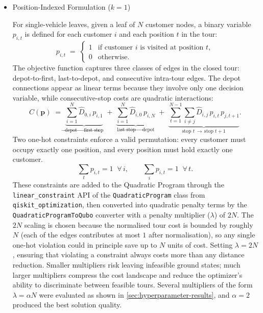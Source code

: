 \documentclass[a4paper]{report}
\begin{document}
{\begin{itemize}
\begin{itemize}

\item{Position-Indexed Formulation ($k=1$)}
 
For single-vehicle leaves, given a leaf of
$N$ customer nodes, a binary variable $p_{i,t}$ is defined for each
customer $i$ and each position $t$ in the tour:
\begin{equation}
p_{i,t} \;=\;
\begin{cases}
1 & \text{if customer } i \text{ is visited at position } t,\\
0 & \text{otherwise}.
\end{cases}
\end{equation}
The objective function captures
three classes of edges in the closed tour: depot-to-first,
last-to-depot, and consecutive intra-tour edges. The depot connections
appear as linear terms because they involve only one decision variable,
while consecutive-stop costs are quadratic interactions:
\begin{equation}
C(\mathbf{p}) \;=\;
\underbrace{\sum_{i=1}^{N} \hat{D}_{0,i}\, p_{i,1}}_{\text{depot}\,\to\,\text{first stop}}
\;+\;
\underbrace{\sum_{i=1}^{N} \hat{D}_{i,0}\, p_{i,N}}_{\text{last stop}\,\to\,\text{depot}}
\;+\;
\underbrace{\sum_{t=1}^{N-1}\sum_{i \neq j} \hat{D}_{i,j}\, p_{i,t}\, p_{j,t+1}}_{\text{stop } t\,\to\,\text{stop } t+1}.
\label{eq:posidx-cost}
\end{equation}
Two one-hot constraints enforce a valid permutation: every
customer must occupy exactly one position, and every position must hold
exactly one customer.
\begin{equation}
\sum_{t} p_{i,t} = 1 \;\;\forall\, i,
\qquad
\sum_{i} p_{i,t} = 1 \;\;\forall\, t.
\end{equation}
These constraints are added to the Quadratic Program through the
\texttt{linear\_constraint} API of the \texttt{QuadraticProgram} class
from \texttt{qiskit\_optimization}, then converted into quadratic
penalty terms by the \texttt{QuadraticProgramToQubo} converter with a
penalty multiplier ($\lambda$) of $2N$. The $2N$ scaling is chosen because the normalised tour cost is bounded by roughly $N$ (each of the edges contributes
at most $1$ after normalisation), so any single one-hot violation
could in principle save up to $N$ units of cost. Setting $\lambda
= 2N$, ensuring that violating a constraint always costs more than any distance reduction. Smaller multipliers risk leaving infeasible ground states;
much larger multipliers compress the cost landscape and reduce the
optimizer's ability to discriminate between feasible tours. Several
multipliers of the form $\lambda = \alpha N$ were evaluated
as shown in \ref{sec:hyperparameter-results}, and $\alpha = 2$ produced the best solution quality.


\end{itemize}
\end{itemize}}
\end{document}
